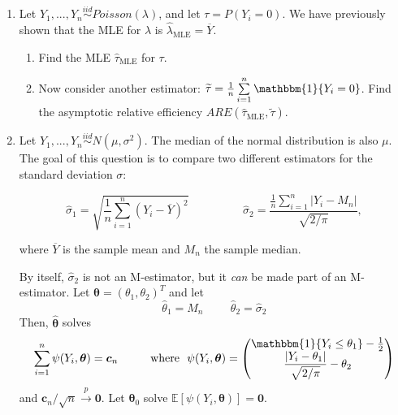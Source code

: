 \documentclass[11pt]{article}
\begin{document}
\begin{enumerate}
The mean and median of the $t_\nu$ distribution are both 0, and the variance is $\dfrac{\nu}{\nu - 2}$ provided that $\nu > 2$.

Let 
$$Y_i = \mu + X_i$$
for some unknown $\mu \in \mathbb{R}$, and consider two estimators of $\mu$: the sample mean $\overline{Y}$, and the sample median $M_n$ calculated from $Y_1,...,Y_n$. Assuming $\nu > 2$, find the asymptotic relative efficiency $ARE(\overline{Y}, M_n)$. 

\bigskip

\item Let $Y_1,...,Y_n \overset{iid}{\sim} Poisson(\lambda)$, and let $\tau = P(Y_i = 0)$. We have previously shown that the MLE for $\lambda$ is $\widehat{\lambda}_{\text{MLE}} = \overline{Y}$.

\begin{enumerate}
\item Find the MLE $\widehat{\tau}_{\text{MLE}}$ for $\tau$.
\item Now consider another estimator: $\widetilde{\tau} = \frac{1}{n} \sum \limits_{i=1}^n \mathbbm{1}\{Y_i = 0 \}$. Find the asymptotic relative efficiency $ARE(\widehat{\tau}_{\text{MLE}}, \widetilde{\tau})$.
\end{enumerate}

\bigskip

\item Let $Y_1,...,Y_n \overset{iid}{\sim} N(\mu, \sigma^2)$. The median of the normal distribution is also $\mu$. The goal of this question is to compare two different estimators for the standard deviation $\sigma$:

$$\widehat{\sigma}_1 = \sqrt{\frac{1}{n} \sum \limits_{i=1}^n (Y_i - \overline{Y})^2} \hspace{2cm} \widehat{\sigma}_2 = \frac{\frac{1}{n} \sum \limits_{i=1}^n |Y_i - M_n|}{\sqrt{2/\pi}},$$

where $\overline{Y}$ is the sample mean and $M_n$ the sample median.

By itself, $\widehat{\sigma}_2$ is not an M-estimator, but it \textit{can} be made part of an M-estimator. Let $\boldsymbol{\theta} = (\theta_1, \theta_2)^T$ and let 
$$\widehat{\theta}_1 = M_n \hspace{1cm} \widehat{\theta}_2 = \widehat{\sigma}_2$$
Then, $\widehat{\boldsymbol{\theta}}$ solves
$$\sum \limits_{i=1}^n \psi(Y_i, \boldsymbol{\theta}) = \boldsymbol{c}_n \hspace{1cm} \text{where } \ \psi(Y_i, \boldsymbol{\theta}) = \begin{pmatrix}
\mathbbm{1}\{Y_i \leq \theta_1\} - \frac{1}{2} \\
\dfrac{|Y_i - \theta_1|}{\sqrt{2/\pi}} - \theta_2
\end{pmatrix}$$
and $\boldsymbol{c}_n/\sqrt{n} \overset{p}{\to} \boldsymbol{0}$. Let $\boldsymbol{\theta}_0$ solve $\mathbb{E}[\psi(Y_i, \boldsymbol{\theta})] = \boldsymbol{0}$.


\end{enumerate}
\end{document}
